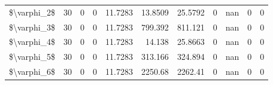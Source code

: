 \begin{tabular}{lrrrrrrrrrr}
 \$\textbackslash{}varphi\_2\$ &  30 & 0        & 0        &  11.7283    &    13.8509  &     25.5792  &     0        &         nan &  0           &       0      \\
 \$\textbackslash{}varphi\_3\$ &  30 & 0        & 0        &  11.7283    &   799.392   &    811.121   &     0        &         nan &  0           &       0      \\
 \$\textbackslash{}varphi\_4\$ &  30 & 0        & 0        &  11.7283    &    14.138   &     25.8663  &     0        &         nan &  0           &       0      \\
 \$\textbackslash{}varphi\_5\$ &  30 & 0        & 0        &  11.7283    &   313.166   &    324.894   &     0        &         nan &  0           &       0      \\
 \$\textbackslash{}varphi\_6\$ &  30 & 0        & 0        &  11.7283    &  2250.68    &   2262.41    &     0        &         nan &  0           &       0      \\
\hline
\end{tabular}

